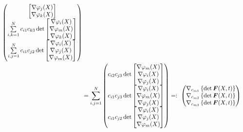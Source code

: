 \begin{align}
\begin{pmatrix}
{\begin{bmatrix}
                            \nabla \varphi_{j}(X) \\
                            \nabla \varphi_{k}(X)
                          \end{bmatrix}
      } \\
      \sum\limits_{i,k=1}^{N}{
        c_{i1}c_{k3} \det \begin{bmatrix}
                            \nabla \varphi_{i}(X) \\
                            \nabla \varphi_{m}(X) \\
                            \nabla \varphi_{k}(X)
                          \end{bmatrix}
      } \\
      \sum\limits_{i,j=1}^{N}{
        c_{i1}c_{j2} \det \begin{bmatrix}
                            \nabla \varphi_{i}(X) \\
                            \nabla \varphi_{j}(X) \\
                            \nabla \varphi_{m}(X)
                          \end{bmatrix}
      }            
    \end{pmatrix}
    \nonumber\\
  &=\sum\limits_{i,j=1}^{N}{
      \begin{pmatrix}
        c_{i2}c_{j3}\det \begin{bmatrix}
                            \nabla \varphi_{m}(X) \\
                            \nabla \varphi_{i}(X) \\
                            \nabla \varphi_{j}(X)
                          \end{bmatrix}
        \\
        c_{i1}c_{j3}\det \begin{bmatrix}
                            \nabla \varphi_{i}(X) \\
                            \nabla \varphi_{m}(X) \\
                            \nabla \varphi_{j}(X)
                          \end{bmatrix}
        \\
        c_{i1}c_{j2}\det \begin{bmatrix}
                            \nabla \varphi_{i}(X) \\
                            \nabla \varphi_{j}(X) \\
                            \nabla \varphi_{m}(X)
                          \end{bmatrix}
      \end{pmatrix}
    }
    =:\ \begin{pmatrix}
          \nabla_{c_{m1}}\left\{\det \boldsymbol{F}(X,t)\right\} \\
          \nabla_{c_{m2}}\left\{\det \boldsymbol{F}(X,t)\right\} \\
          \nabla_{c_{m3}}\left\{\det \boldsymbol{F}(X,t)\right\}                  
        \end{pmatrix}
\end{align}
